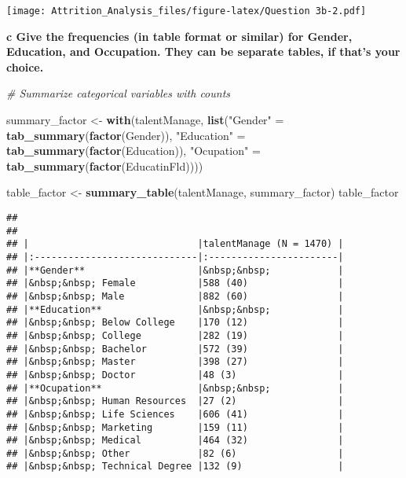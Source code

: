\documentclass[]{article}
\newenvironment{Shaded}{\begin{snugshade}}{\end{snugshade}}
\newcommand{\KeywordTok}[1]{\textcolor[rgb]{0.13,0.29,0.53}{\textbf{{#1}}}}
\newcommand{\StringTok}[1]{\textcolor[rgb]{0.31,0.60,0.02}{{#1}}}
\newcommand{\CommentTok}[1]{\textcolor[rgb]{0.56,0.35,0.01}{\textit{{#1}}}}
\newcommand{\NormalTok}[1]{{#1}}
\begin{document}
\texttt{[image: Attrition\_Analysis\_files/figure-latex/Question 3b-2.pdf]}

\textbf{c Give the frequencies (in table format or similar) for Gender,
Education, and Occupation. They can be separate tables, if that's your
choice.}

\begin{Shaded}
\begin{Highlighting}[]
\CommentTok{# Summarize categorical variables with counts}

\NormalTok{summary_factor <-}\StringTok{ }\KeywordTok{with}\NormalTok{(talentManage,}
                \KeywordTok{list}\NormalTok{(}\StringTok{"Gender"} \NormalTok{=}\StringTok{ }\KeywordTok{tab_summary}\NormalTok{(}\KeywordTok{factor}\NormalTok{(Gender)),}
                     \StringTok{"Education"} \NormalTok{=}\StringTok{ }\KeywordTok{tab_summary}\NormalTok{(}\KeywordTok{factor}\NormalTok{(Education)),}
                     \StringTok{"Ocupation"} \NormalTok{=}\StringTok{ }\KeywordTok{tab_summary}\NormalTok{(}\KeywordTok{factor}\NormalTok{(EducatinFld))))}

\NormalTok{table_factor <-}\StringTok{ }\KeywordTok{summary_table}\NormalTok{(talentManage, summary_factor)}
\NormalTok{table_factor}
\end{Highlighting}
\end{Shaded}

\begin{verbatim}
## 
## 
## |                              |talentManage (N = 1470) |
## |:-----------------------------|:-----------------------|
## |**Gender**                    |&nbsp;&nbsp;            |
## |&nbsp;&nbsp; Female           |588 (40)                |
## |&nbsp;&nbsp; Male             |882 (60)                |
## |**Education**                 |&nbsp;&nbsp;            |
## |&nbsp;&nbsp; Below College    |170 (12)                |
## |&nbsp;&nbsp; College          |282 (19)                |
## |&nbsp;&nbsp; Bachelor         |572 (39)                |
## |&nbsp;&nbsp; Master           |398 (27)                |
## |&nbsp;&nbsp; Doctor           |48 (3)                  |
## |**Ocupation**                 |&nbsp;&nbsp;            |
## |&nbsp;&nbsp; Human Resources  |27 (2)                  |
## |&nbsp;&nbsp; Life Sciences    |606 (41)                |
## |&nbsp;&nbsp; Marketing        |159 (11)                |
## |&nbsp;&nbsp; Medical          |464 (32)                |
## |&nbsp;&nbsp; Other            |82 (6)                  |
## |&nbsp;&nbsp; Technical Degree |132 (9)                 |
\end{verbatim}
\end{document}
